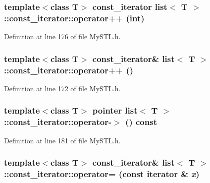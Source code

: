 \subsubsection[{operator++}]{\setlength{\rightskip}{0pt plus 5cm}template$<$class T$>$ {\bf const\_\-iterator} {\bf list}$<$ T $>$::const\_\-iterator::operator++ (int)}\label{classlist_1_1const__iterator_a5f3554942c53d3367c553398624bd228}


Definition at line 176 of file MySTL.h.

\subsubsection[{operator++}]{\setlength{\rightskip}{0pt plus 5cm}template$<$class T$>$ {\bf const\_\-iterator}\& {\bf list}$<$ T $>$::const\_\-iterator::operator++ ()}\label{classlist_1_1const__iterator_a6c76fbbc124a174f63924602ab43a06b}


Definition at line 172 of file MySTL.h.

\subsubsection[{operator-\/$>$}]{\setlength{\rightskip}{0pt plus 5cm}template$<$class T$>$ {\bf pointer} {\bf list}$<$ T $>$::const\_\-iterator::operator-\/$>$ () const}\label{classlist_1_1const__iterator_ab8891c556d2becef8b3c88800bc5fa98}


Definition at line 181 of file MySTL.h.

\subsubsection[{operator=}]{\setlength{\rightskip}{0pt plus 5cm}template$<$class T$>$ {\bf const\_\-iterator}\& {\bf list}$<$ T $>$::const\_\-iterator::operator= (const {\bf iterator} \& {\em x})}\label{classlist_1_1const__iterator_abae625ab29b9b8731e205f3ed9dea5ee}


